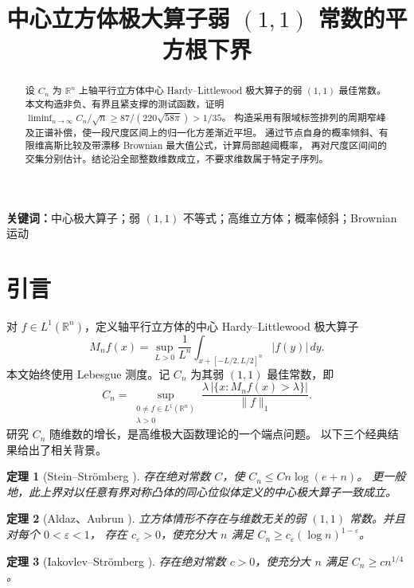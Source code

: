 \documentclass[UTF8,a4paper,11pt,fontset=fandol]{ctexart}
\title{中心立方体极大算子弱 $(1,1)$ 常数的平方根下界}
\date{}
\newtheorem{historical}{定理}
\theoremstyle{remark}
\begin{document}
\maketitle
\vspace{-2em}
\begin{abstract}
设 $C_n$ 为 $\mathbb R^n$ 上轴平行立方体中心 Hardy--Littlewood 极大算子的弱 $(1,1)$ 最佳常数。
本文构造非负、有界且紧支撑的测试函数，证明
$\liminf_{n\to\infty}C_n/\sqrt n\ge87/(220\sqrt{58\pi})>1/35$。
构造采用有限域标签排列的周期窄峰及正谱补偿，使一段尺度区间上的归一化方差渐近平坦。
通过节点自身的概率倾斜、有限维高斯比较及带漂移 Brownian 最大值公式，计算局部越阈概率，
再对尺度区间间的交集分别估计。结论沿全部整数维数成立，不要求维数属于特定子序列。
\end{abstract}
\noindent\textbf{关键词：}中心极大算子；弱 $(1,1)$ 不等式；高维立方体；概率倾斜；Brownian 运动
\par\medskip
\section{引言}
对 $f\in L^1(\mathbb R^n)$，定义轴平行立方体的中心 Hardy--Littlewood 极大算子
\[
 M_nf(x)=\sup_{L>0}\frac1{L^n}\int_{x+[-L/2,L/2]^n}|f(y)|\,dy.
\]
本文始终使用 Lebesgue 测度。记 $C_n$ 为其弱 $(1,1)$ 最佳常数，即
\begin{equation}\label{eq:definitionCn}
 C_n=\sup_{\substack{0\ne f\in L^1(\mathbb R^n)\\ \lambda>0}}
 \frac{\lambda\,|\{x:M_nf(x)>\lambda\}|}{\|f\|_1}.
\end{equation}
研究 $C_n$ 随维数的增长，是高维极大函数理论的一个端点问题。
以下三个经典结果给出了相关背景。

\begin{historical}[Stein--Strömberg \cite{SS1983}]
存在绝对常数 $C$，使 $C_n\le Cn\log(e+n)$。
更一般地，此上界对以任意有界对称凸体的同心位似体定义的中心极大算子一致成立。
\end{historical}

\begin{historical}[Aldaz、Aubrun \cite{Aldaz2011,Aubrun2009}]
立方体情形不存在与维数无关的弱 $(1,1)$ 常数。并且对每个 $0<\varepsilon<1$，
存在 $c_\varepsilon>0$，使充分大 $n$ 满足
$C_n\ge c_\varepsilon(\log n)^{1-\varepsilon}$。
\end{historical}

\begin{historical}[Iakovlev--Strömberg \cite{IS2013}]
存在绝对常数 $c>0$，使充分大 $n$ 满足 $C_n\ge c n^{1/4}$。
\end{historical}
\end{document}
